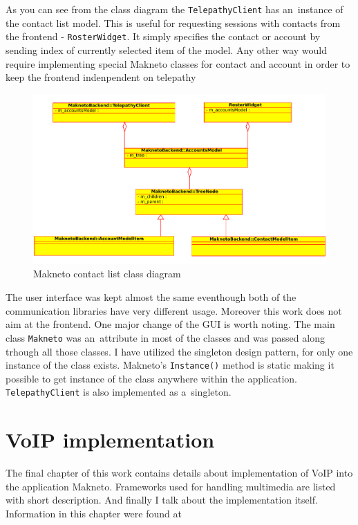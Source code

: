 As you can see from the class diagram the \verb|TelepathyClient| has an~instance of the contact list model. This is useful for requesting sessions with contacts from the frontend - \verb|RosterWidget|. It simply specifies the contact or account by sending index of currently selected item of the model. Any other way would require implementing special Makneto classes for contact and account in order to keep the frontend indenpendent on telepathy   

\begin{figure}[ht]
	\begin{center}
	\includegraphics[width=15cm]{fig/contact-list-class-diag.pdf}
	\caption{Makneto contact list class diagram}
	\label{fig:contactListClassDiag}
\end{center}
\end{figure}

The user interface was kept almost the same eventhough both of the communication libraries have very different usage. Moreover this work does not aim at the frontend. One major change of the GUI is worth noting. The main class \verb|Makneto| was an~attribute in most of the classes and was passed along trhough all those classes. I have utilized the singleton design pattern, for only one instance of the class exists. Makneto's \verb|Instance()| method is static making it possible to get instance of the class  anywhere within the application. \verb|TelepathyClient| is also implemented as a~singleton. 


\chapter{VoIP implementation}\label{chapter:voip-implementation}
The final chapter of this work contains details about implementation of VoIP into the application Makneto. Frameworks used for handling multimedia are listed with short description. And finally I talk about the implementation itself. Information in this chapter were found at \cite{gstreamer, phonon, farsight} 

